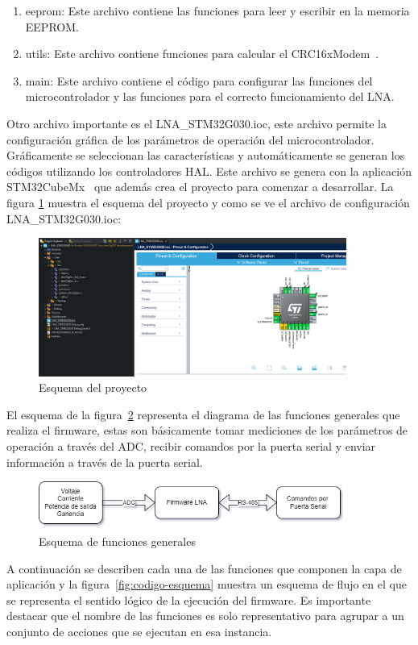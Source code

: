 \documentclass[12pt,twoside,onecolumn]{article}
\begin{document}
\begin{enumerate}
\setlength\itemsep{-0.1em}
\item eeprom: Este archivo contiene las funciones para leer y escribir en la memoria EEPROM.
\item utils: Este archivo contiene funciones para calcular el CRC16xModem~\cite{web:crc}.
\item main: Este archivo contiene el código para configurar las funciones del microcontrolador y las funciones para el correcto funcionamiento del LNA.
\end{enumerate}

Otro archivo importante es el LNA\_STM32G030.ioc, este archivo permite la configuración gráfica de los parámetros de operación del microcontrolador. Gráficamente se seleccionan las características y automáticamente se generan los códigos utilizando los controladores HAL. Este archivo se genera con la aplicación STM32CubeMx~\cite{web:stm32cubemx} que además crea el proyecto para comenzar a desarrollar. La figura \ref{fig:stm32cubemx} muestra el esquema del proyecto y como se ve el archivo de configuración LNA\_STM32G030.ioc:

\begin{figure}[H]
  \centering
   \includegraphics[width=0.9\textwidth]{figures/stm32cubemx.png}
  \caption{Esquema del proyecto}
    \label{fig:stm32cubemx}
\end{figure}

El esquema de la figura~\ref{fig:funciones} representa el diagrama de las funciones generales que realiza el firmware, estas son básicamente  tomar mediciones de los parámetros de operación a través del ADC, recibir comandos por la puerta serial y enviar información a través de la puerta serial.

\begin{figure}[H]
  \centering
   \includegraphics[width=0.9\textwidth]{figures/funciones.png}
  \caption{Esquema de funciones generales}
    \label{fig:funciones}
\end{figure}
\newpage
 A continuación se describen cada una de las funciones que componen la capa de aplicación y la figura~\ref{fig:codigo-esquema} muestra un esquema de flujo en el que se representa el sentido lógico de la ejecución del firmware. Es importante destacar que el nombre de las funciones es solo representativo para agrupar a un conjunto de acciones que se ejecutan en esa instancia.
\end{document}

